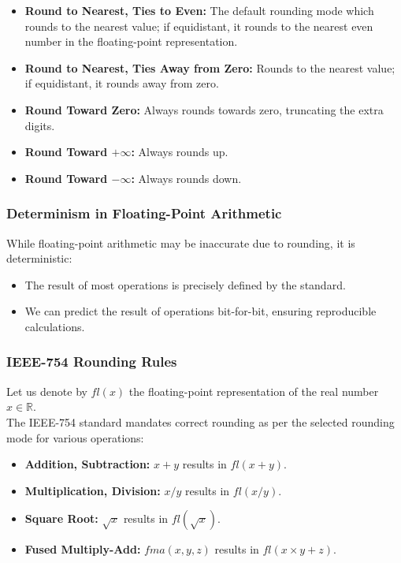 \documentclass[12pt]{article}
\begin{document}
\begin{itemize}
    \item \textbf{Round to Nearest, Ties to Even:} The default rounding mode which rounds to the nearest value; if equidistant, it rounds to the nearest even number in the floating-point representation.
    \item \textbf{Round to Nearest, Ties Away from Zero:} Rounds to the nearest value; if equidistant, it rounds away from zero.
    \item \textbf{Round Toward Zero:} Always rounds towards zero, truncating the extra digits.
    \item \textbf{Round Toward \(+\infty\):} Always rounds up.
    \item \textbf{Round Toward \(-\infty\):} Always rounds down.
\end{itemize}

\subsubsection{Determinism in Floating-Point Arithmetic}
While floating-point arithmetic may be inaccurate due to rounding, it is deterministic:

\begin{itemize}
    \item The result of most operations is precisely defined by the standard.
    \item We can predict the result of operations bit-for-bit, ensuring reproducible calculations.
\end{itemize}

\subsubsection{IEEE-754 Rounding Rules}
Let us denote by \(fl(x)\) the floating-point representation of the real number $x \in \mathbb{R}$.\\
The IEEE-754 standard mandates correct rounding as per the selected rounding mode for various operations:

\begin{itemize}
    \item \textbf{Addition, Subtraction:} \( x + y \) results in \( fl(x + y) \).
    \item \textbf{Multiplication, Division:} \( x / y \) results in \( fl(x / y) \).
    \item \textbf{Square Root:} \( \sqrt{x} \) results in \( fl(\sqrt{x}) \).
    \item \textbf{Fused Multiply-Add:} \( fma(x, y, z) \) results in \( fl(x \times y + z) \).
\end{itemize}
\end{document}

